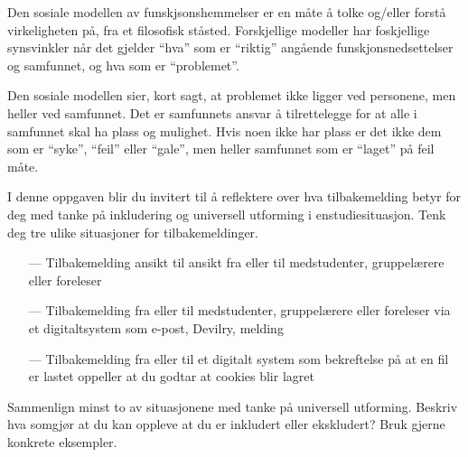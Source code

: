 \documentclass{../../myassignment}
\begin{document}
\begin{answer}
\begin{description}[style=nextline]
			\item [Sosial modell] Den sosiale modellen av funskjsonshemmelser er en måte å tolke og/eller forstå virkeligheten på, fra et filosofisk ståsted. Forskjellige modeller har foskjellige synsvinkler når det gjelder ``hva'' som er ``riktig'' angående funskjonsnedsettelser og samfunnet, og hva som er ``problemet''. 

			Den sosiale modellen sier, kort sagt, at problemet ikke ligger ved personene, men heller ved samfunnet. Det er samfunnets ansvar å tilrettelegge for at alle i samfunnet skal ha plass og mulighet. Hvis noen ikke har plass er det ikke dem som er ``syke'', ``feil'' eller ``gale'', men heller samfunnet som er ``laget'' på feil måte.

		\end{description}
	\end{answer}

	\newpage

	\begin{problem}
		I denne oppgaven blir du invitert til å reflektere over hva tilbakemelding betyr for deg med tanke på inkludering og universell utforming i enstudiesituasjon. Tenk deg tre ulike situasjoner for tilbakemeldinger.

		\begin{itemize}
			\item[---] Tilbakemelding ansikt til ansikt fra eller til medstudenter, gruppelærere eller foreleser
			\item[---] Tilbakemelding fra eller til medstudenter, gruppelærere eller foreleser via et digitaltsystem som e-post, Devilry, melding
			\item[---] Tilbakemelding fra eller til et digitalt system som bekreftelse på at en fil er lastet oppeller at du godtar at cookies blir lagret
		\end{itemize}
		Sammenlign minst to av situasjonene med tanke på universell utforming. Beskriv hva somgjør at du kan oppleve at du er inkludert eller ekskludert? Bruk gjerne konkrete eksempler.
	\end{problem}
\end{document}
